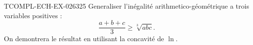 \begin{exercice}{TCOMPL-ECH-EX-026}{3}{25}
Generaliser l'inégalité arithmetico-géométrique a trois variables positives :
\[ \frac{a+b+c}{3} \geq \sqrt[3]{abc}. \]
On demontrera le résultat en utilisant la concavité de $\ln$.

\end{exercice}

